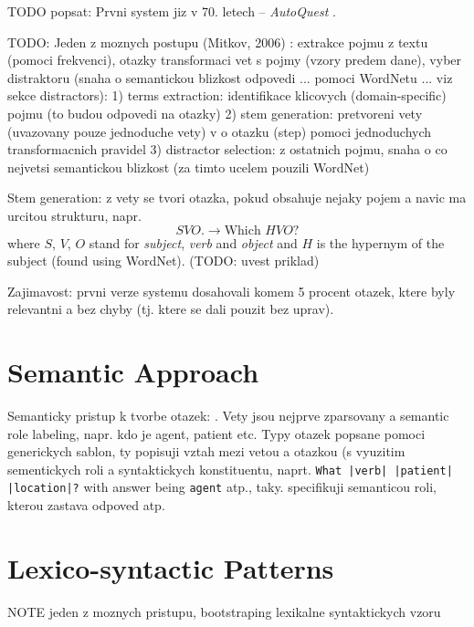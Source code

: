\documentclass[a4paper, 12pt, twoside]{fithesis2}		%
\renewcommand{\_}{\leavevmode \kern0.0em\vbox{\hrule width0.4em}}
\begin{document}
TODO popsat: Prvni system jiz v 70. letech -- \textit{AutoQuest} \cite{questions-wolfe}.

TODO: Jeden z moznych postupu (Mitkov, 2006) \cite{question-gen-mitkov}:
extrakce pojmu z textu (pomoci frekvenci), otazky transformaci vet s pojmy (vzory predem dane), vyber distraktoru (snaha o semantickou blizkost odpovedi ... pomoci WordNetu ... viz sekce distractors):
1) terms extraction: identifikace klicovych (domain-specific) pojmu (to budou odpovedi na otazky)
2) stem generation: pretvoreni vety (uvazovany pouze jednoduche vety) v o otazku (step) pomoci jednoduchych transformacnich pravidel
3) distractor selection: z ostatnich pojmu, snaha o co nejvetsi semantickou blizkost (za timto ucelem pouzili WordNet)


Stem generation: z vety se tvori otazka, pokud obsahuje nejaky pojem a navic ma urcitou strukturu, napr.
$$
S V O \text{.} \longrightarrow \text{Which } H V O \text{?}
$$
where $S$, $V$, $O$ stand for \textit{subject}, \textit{verb} and \textit{object} and $H$ is the hypernym of the subject (found using WordNet). (TODO: uvest priklad)

Zajimavost: prvni verze systemu dosahovali komem 5 procent otazek, ktere byly relevantni a bez chyby (tj. ktere se dali pouzit bez uprav).


\section{Semantic Approach}
\label{sec:questions-semantically}

Semanticky pristup k tvorbe otazek: \cite{questions-eval}.
Vety jsou nejprve zparsovany a semantic role labeling, napr. kdo je agent, patient etc.
Typy otazek popsane pomoci generickych sablon, ty popisuji vztah mezi vetou a otazkou (s vyuzitim sementickych roli a syntaktickych konstituentu, naprt. \texttt{What |verb| |patient| |location|?} with answer being \texttt{agent} atp., taky. specifikuji semanticou roli, kterou zastava odpoved atp.


\section{Lexico-syntactic Patterns}
\label{sec:lexico-syntactic-patterns}


NOTE jeden z moznych pristupu, bootstraping lexikalne syntaktickych vzoru
\end{document}
